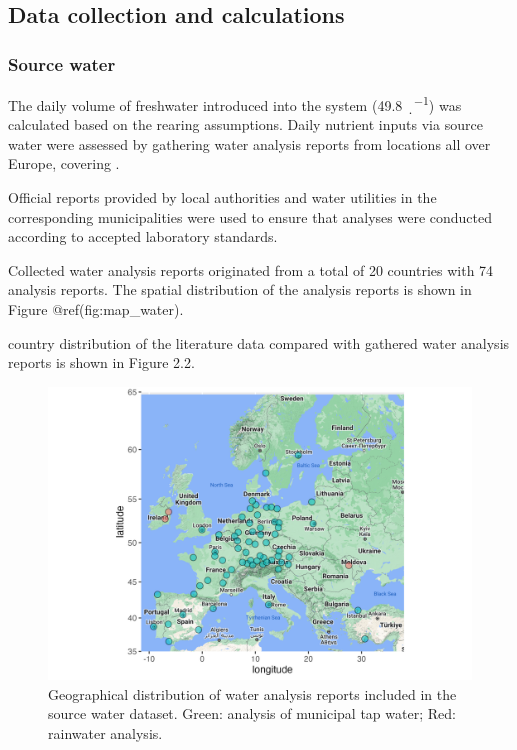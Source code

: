 \documentclass[preprint, 3p,
authoryear]{elsarticle} %
\begin{document}
\hypertarget{data-collection-and-calculations}{%
\subsection{Data collection and
calculations}\label{data-collection-and-calculations}}

\hypertarget{source-water}{%
\subsubsection{Source water}\label{source-water}}

The daily volume of freshwater introduced into the system (49.8
\si{\p\per\d}) was calculated based on the rearing assumptions. Daily
nutrient inputs via source water were assessed by gathering water
analysis reports from locations all over Europe, covering .

Official reports provided by local authorities and water utilities in
the corresponding municipalities were used to ensure that analyses were
conducted according to accepted laboratory standards.

Collected water analysis reports originated from a total of 20 countries
with 74 analysis reports. The spatial distribution of the analysis
reports is shown in Figure @ref(fig:map\_water).

country distribution of the literature data compared with gathered water
analysis reports is shown in Figure 2.2.

\begin{figure}
\centering
  \includegraphics{../plots/map.png}
  \caption{Geographical distribution of water analysis reports included in the source water dataset. Green: analysis of municipal tap water; Red: rainwater analysis.}
  \label{fig:map_water}
\end{figure}
\end{document}

